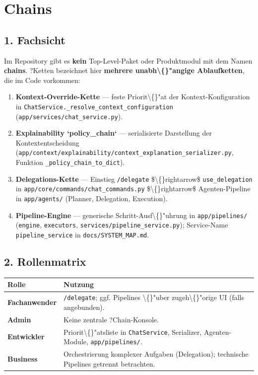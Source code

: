 \section{Chains}

\subsection{1. Fachsicht}

Im Repository gibt es \textbf{kein} Top-Level-Paket oder Produktmodul mit dem Namen \textbf{chains}. ?Ketten\texttt{} bezeichnet hier \textbf{mehrere unabh\textbackslash\{\}"angige Ablaufketten}, die im Code vorkommen:

\begin{enumerate}
\item \textbf{Kontext-Override-Kette} --- feste Priorit\textbackslash\{\}"at der Kontext-Konfiguration in \texttt{ChatService.\_resolve\_context\_configuration} (\texttt{app/services/chat\_service.py}).
\item \textbf{Explainability `policy\_chain`} --- serialisierte Darstellung der Kontextentscheidung (\texttt{app/context/explainability/context\_explanation\_serializer.py}, Funktion \texttt{\_policy\_chain\_to\_dict}).
\item \textbf{Delegations-Kette} --- Einstieg \texttt{/delegate} \$\textbackslash\{\}rightarrow\$ \texttt{use\_delegation} in \texttt{app/core/commands/chat\_commands.py} \$\textbackslash\{\}rightarrow\$ Agenten-Pipeline in \texttt{app/agents/} (Planner, Delegation, Execution).
\item \textbf{Pipeline-Engine} --- generische Schritt-Ausf\textbackslash\{\}"uhrung in \texttt{app/pipelines/} (\texttt{engine}, \texttt{executors}, \texttt{services/pipeline\_service.py}); Service-Name \texttt{pipeline\_service} in \texttt{docs/SYSTEM\_MAP.md}.
\end{enumerate}

\subsection{2. Rollenmatrix}

\begin{center}
\begin{tabular}{ll}
\hline
Rolle & Nutzung \\
\hline
\textbf{Fachanwender} & \texttt{/delegate}; ggf. Pipelines \textbackslash\{\}"uber zugeh\textbackslash\{\}"orige UI (falls angebunden). \\
\textbf{Admin} & Keine zentrale ?Chain\texttt{}-Konsole. \\
\textbf{Entwickler} & Priorit\textbackslash\{\}"atsliste in \texttt{ChatService}, Serializer, Agenten-Module, \texttt{app/pipelines/}. \\
\textbf{Business} & Orchestrierung komplexer Aufgaben (Delegation); technische Pipelines getrennt betrachten. \\
\hline
\end{tabular}
\end{center}

